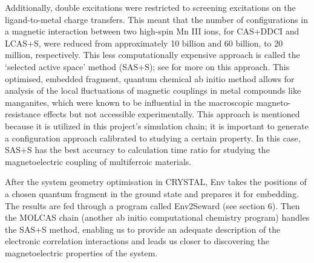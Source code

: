 \documentclass[10pt]{article}
\begin{document}
Additionally, double excitations were restricted to screening excitations on the ligand-to-metal charge transfers. This meant that the number of configurations in a magnetic interaction between two high-spin Mn III ions, for CAS+DDCI and LCAS+S, were reduced from approximately 10 billion and 60 billion, to 20 million, respectively. This less computationally expensive approach is called the `selected active space' method (SAS+S); see \cite{gelle2009accurate} for more on this approach. This optimised, embedded fragment, quantum chemical ab initio method allows for analysis of the local fluctuations of magnetic couplings in metal compounds like manganites, which were known to be influential in the macroscopic magneto-resistance effects but not accessible experimentally. This approach is mentioned because it is utilized in this project's simulation chain; it is important to generate a configuration approach calibrated to studying a certain property. In this case, SAS+S has the best accuracy to calculation time ratio for studying the magnetoelectric coupling of multiferroic materials.

After the system geometry optimisation in CRYSTAL, Env takes the positions of a chosen quantum fragment in the ground state and prepares it for embedding. The results are fed through a program called Env2Seward (see section 6). Then the MOLCAS chain (another ab initio computational chemistry program) handles the SAS+S method, enabling us to provide an adequate description of the electronic correlation interactions and leads us closer to discovering the magnetoelectric properties of the system.


\end{document}
